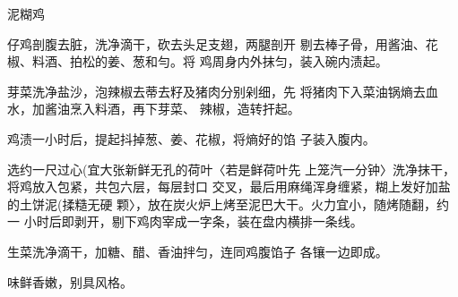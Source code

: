\begin{recipe}[叫化鸡]{泥糊鸡}

\ingredients




\cooking

\step 	仔鸡剖腹去脏，洗净滴干，砍去头足支翅，两腿剖开 剔去棒子骨，用酱油、花椒、料酒、拍松的姜、葱和勻。将 鸡周身内外抹匀，装入碗内渍起。

\step 	芽菜洗净盐沙，泡辣椒去蒂去籽及猪肉分别剁细，先 将猪肉下入菜油锅熵去血水，加酱油烹入料酒，再下芽菜、 辣椒，造转扞起。

\step 	鸡渍一小时后，提起抖掉葱、姜、花椒，将熵好的馅 子装入腹内。

\step 	选约一尺过心(宜大张新鲜无孔的荷叶〈若是鲜荷叶先 上笼汽一分钟〉洗净抹干，将鸡放入包紧，共包六层，每层封口 交叉，最后用麻绳浑身缠紧，糊上发好加盐的土饼泥(揉糙无硬 颗〉，放在炭火炉上烤至泥巴大干。火力宜小，随烤随翻，约一 小时后即剥开，剔下鸡肉宰成一字条，装在盘内横排一条线。

\step 生菜洗净滴干，加糖、醋、香油拌匀，连同鸡腹馅子 各镶一边即成。

\notes

味鲜香嫩，别具风格。

\end{recipe}


